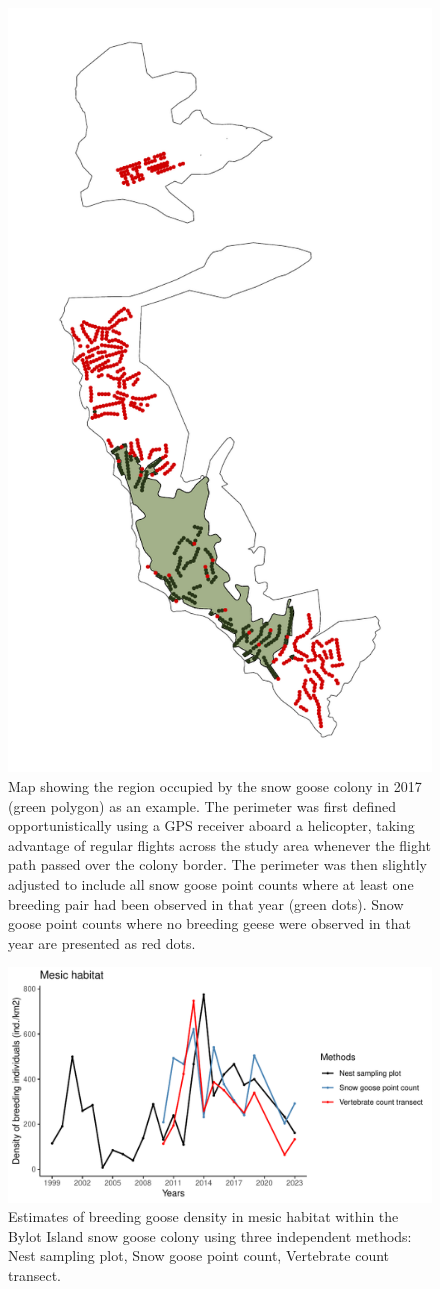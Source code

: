 \documentclass[a4paper,twoside,12pt]{article}
\begin{document}
\begin{enumerate}[label=\alph*.]
        \begin{figure}[ht]
        \centering
        \includegraphics[width=0.5\linewidth]{figures/map_geese_colony_2017.pdf}
        \caption{Map showing the region occupied by the snow goose colony in 2017 (green polygon) as an example. The perimeter was first defined opportunistically using a GPS receiver aboard a helicopter, taking advantage of regular flights across the study area whenever the flight path passed over the colony border. The perimeter was then slightly adjusted to include all snow goose point counts where at least one breeding pair had been observed in that year (green dots). Snow goose point counts where no breeding geese were observed in that year are presented as red dots.}
        \label{figure:sngo_goose_colony}
        \end{figure}
        
        \begin{figure}[ht]
        \centering
        \includegraphics[width=\linewidth]{figures/snow_goose_mesic_density.pdf}
        \caption{Estimates of breeding goose density in mesic habitat within the Bylot Island snow goose colony using three independent methods: Nest sampling plot, Snow goose point count, Vertebrate count transect.}
        \label{figure:sngo_interannual_variation}
        \end{figure}
        \newpage
                                

\end{enumerate}
\end{document}
